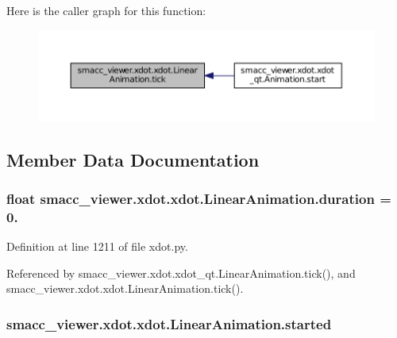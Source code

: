 Here is the caller graph for this function\+:
\nopagebreak
\begin{figure}[H]
\begin{center}
\leavevmode
\includegraphics[width=350pt]{classsmacc__viewer_1_1xdot_1_1xdot_1_1LinearAnimation_abb19e464117a6a610e3883d76d491abe_icgraph}
\end{center}
\end{figure}




\subsection{Member Data Documentation}
\subsubsection[{\texorpdfstring{duration}{duration}}]{\setlength{\rightskip}{0pt plus 5cm}float smacc\+\_\+viewer.\+xdot.\+xdot.\+Linear\+Animation.\+duration = 0.\hspace{0.3cm}{\ttfamily [static]}}\hypertarget{classsmacc__viewer_1_1xdot_1_1xdot_1_1LinearAnimation_aeac27ed4f9223c7f384f738513cb4de0}{}\label{classsmacc__viewer_1_1xdot_1_1xdot_1_1LinearAnimation_aeac27ed4f9223c7f384f738513cb4de0}


Definition at line 1211 of file xdot.\+py.



Referenced by smacc\+\_\+viewer.\+xdot.\+xdot\+\_\+qt.\+Linear\+Animation.\+tick(), and smacc\+\_\+viewer.\+xdot.\+xdot.\+Linear\+Animation.\+tick().

\subsubsection[{\texorpdfstring{started}{started}}]{\setlength{\rightskip}{0pt plus 5cm}smacc\+\_\+viewer.\+xdot.\+xdot.\+Linear\+Animation.\+started}\hypertarget{classsmacc__viewer_1_1xdot_1_1xdot_1_1LinearAnimation_a4b3e538814e2dbaac661cf9fe09e8c68}{}\label{classsmacc__viewer_1_1xdot_1_1xdot_1_1LinearAnimation_a4b3e538814e2dbaac661cf9fe09e8c68}


